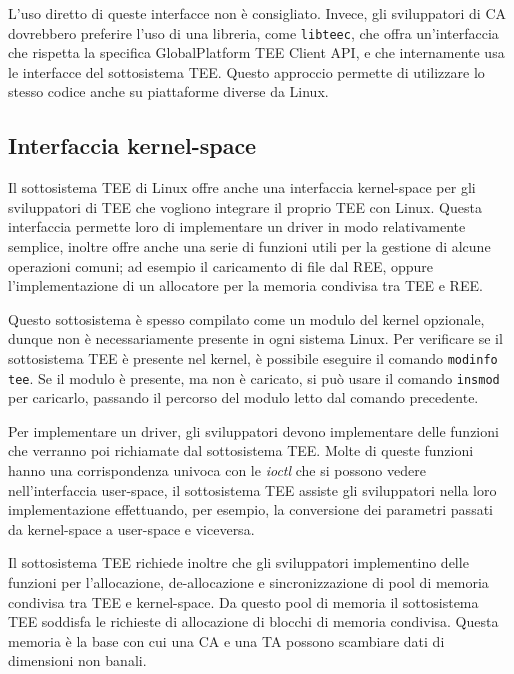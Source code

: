 \documentclass[12pt,italian]{report}
\begin{document}
L'uso diretto di queste interfacce non è consigliato.
Invece, gli sviluppatori di CA dovrebbero preferire l'uso di una libreria, come
\texttt{libteec}, che offra un'interfaccia che rispetta la specifica
GlobalPlatform TEE Client API\cite{gp2020internalapi},
e che internamente usa
le interfacce del sottosistema TEE.
Questo approccio permette di utilizzare lo stesso codice anche su
piattaforme diverse da Linux.

\subsection{Interfaccia kernel-space}
\label{sec:interfaccia-kernel-space}
Il sottosistema TEE di Linux offre anche una interfaccia kernel-space per
gli sviluppatori di TEE che vogliono integrare il proprio TEE con Linux.
Questa interfaccia permette loro di implementare un driver in modo
relativamente semplice, inoltre offre anche una serie di funzioni
utili per la gestione di alcune operazioni comuni; ad esempio il caricamento
di file dal REE, oppure l'implementazione di un allocatore per la memoria
condivisa tra TEE e REE.

Questo sottosistema è spesso compilato come un modulo del kernel opzionale,
dunque non è necessariamente presente in ogni sistema Linux.
Per verificare se il sottosistema TEE è presente nel kernel, è possibile
eseguire il comando \texttt{modinfo tee}.
Se il modulo è presente, ma non è caricato, si può usare il comando
\texttt{insmod} per caricarlo, passando il percorso del modulo letto
dal comando precedente.

\bigbreak \noindent

Per implementare un driver, gli sviluppatori devono implementare
delle funzioni che verranno poi richiamate dal sottosistema TEE.
Molte di queste funzioni hanno una corrispondenza univoca con le
\textit{ioctl} che si possono vedere nell'interfaccia user-space,
il sottosistema TEE assiste gli sviluppatori nella loro
implementazione effettuando, per esempio, la conversione dei parametri
passati da kernel-space a user-space e viceversa.

Il sottosistema TEE richiede inoltre che gli sviluppatori
implementino delle funzioni per l'allocazione, de-allocazione e
sincronizzazione di pool di memoria condivisa tra TEE e kernel-space.
Da questo pool di memoria il sottosistema TEE soddisfa le richieste
di allocazione di blocchi di memoria condivisa.
Questa memoria è la base con cui una CA e una TA possono scambiare
dati di dimensioni non banali.
\end{document}
